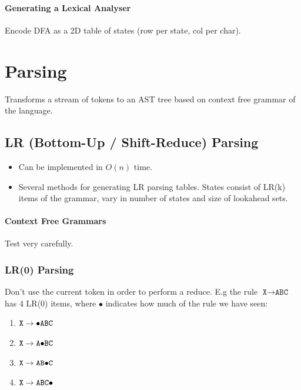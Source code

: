 \documentclass[twocolumn,english]{article}
\begin{document}
\paragraph{Generating a Lexical Analyser}

Encode DFA as a 2D table of states (row per state, col per char).


\section{Parsing}

Transforms a stream of tokens to an AST tree based on context free
grammar of the language.


\subsection{LR (Bottom-Up / Shift-Reduce) Parsing}
\begin{itemize}
\item Can be implemented in $O(n)$ time. 
\item Several methods for generating LR parsing tables. States consist of
LR(k) items of the grammar, vary in number of states and size of lookahead
sets. 
\end{itemize}

\paragraph{Context Free Grammars}

Test very carefully.


\subsubsection{LR(0) Parsing}

Don't use the current token in order to perform a reduce. E.g the
rule $\texttt{X}\rightarrow\texttt{ABC}$ has 4 LR(0) items, where
$\bullet$ indicates how much of the rule we have seen: 
\begin{enumerate}
\item $\texttt{X}\rightarrow\texttt{\ensuremath{\bullet}ABC}$ 
\item $\texttt{X}\rightarrow\texttt{A\ensuremath{\bullet}BC}$ 
\item $\texttt{X}\rightarrow\texttt{AB\ensuremath{\bullet}C}$ 
\item $\texttt{X}\rightarrow\texttt{ABC\ensuremath{\bullet}}$ 
\end{enumerate}
\end{document}
